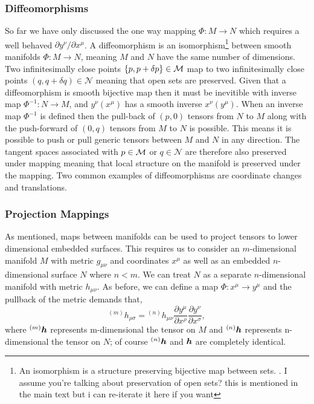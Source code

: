 \subsubsection{Diffeomorphisms}
So far we have only discussed the one way mapping $\Phi :M \rightarrow N$ which
requires a well behaved $\partial y^\nu / \partial x^\mu$. A diffeomorphism is an
isomorphism\footnote{An isomorphism is a structure
preserving bijective map between sets.
{\color{choral} . I assume you're talking about preservation of open sets? this is
mentioned in the main text but i can re-iterate it here if you want}}
between smooth manifolds $\Phi :M \rightarrow N$,
meaning $M$ and $N$ have the same number of dimensions. Two infinitesimally close
points $\{p,p+\delta p\}\in\mathcal{M}$ map to two infinitesimally close points
$(q,q+\delta q)\in\mathcal{N}$ meaning that open sets are preserved. Given that
a diffeomorphism is smooth bijective map then it must be inevitible with inverse
map $\Phi^{-1}:N \rightarrow M$, and $y^\nu(x^\mu)$ has a smooth inverse $x^\nu(y^\mu)$.
When an inverse map $\Phi^{-1}$ is defined then the pull-back of $(p,0)$ tensors
from $N$ to $M$ along with the push-forward of $(0,q)$ tensors from $M$ to $N$ is
possible. This means it is possible to push or pull generic tensors between $M$
and $N$ in any direction. The tangent spaces associated with $p \in \mathcal{M}$ or $q \in \mathcal{N}$
are therefore also preserved under mapping meaning that local structure on the
manifold is preserved under the mapping. Two common examples of diffeomorphisms
are coordinate changes and translations.

\subsubsection{Projection Mappings}
As mentioned, maps between manifolds can be used to project tensors to lower dimensional embedded surfaces. This requires us to consider an $m$-dimensional manifold $M$ with metric $g_{\mu\nu}$ and coordinates $x^\mu$ as well as an embedded $n$-dimensional surface $N$ where $n<m$. We can treat $N$ as a separate $n$-dimensional manifold with metric $h_{\mu\nu}$. As before, we can define a map $\Phi:x^\mu \rightarrow y^\mu$ and the pullback of the metric demands that,
\begin{equation}
{}^{(m)}h_{\rho\sigma} = {}^{(n)}h_{\mu\nu}\frac{\partial y^\mu  }{\partial x^\rho  } \frac{\partial y^\nu  }{\partial x^\sigma  },
\end{equation}
where ${}^{(m)}\boldsymbol{h}$ represents m-dimensional the tensor on $M$ and ${}^{(n)}\boldsymbol{h}$ represents n-dimensional the tensor on $N$; of course ${}^{(n)}\boldsymbol{h}$ and $\boldsymbol{h}$ are completely identical.

